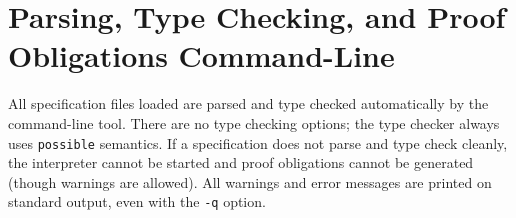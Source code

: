 \documentclass{overturerepchap}
\begin{document}




\section{Parsing, Type Checking, and Proof Obligations Command-Line}

All specification files loaded are parsed and type checked
automatically by the command-line tool. There are no type checking options; the type checker
always uses \texttt{possible} semantics. If a specification does not parse
and type check cleanly, the interpreter cannot be started and proof
obligations cannot be generated (though warnings are allowed). All
warnings and error messages are printed on standard output, even
with the \texttt{-q} option.
\end{document}
